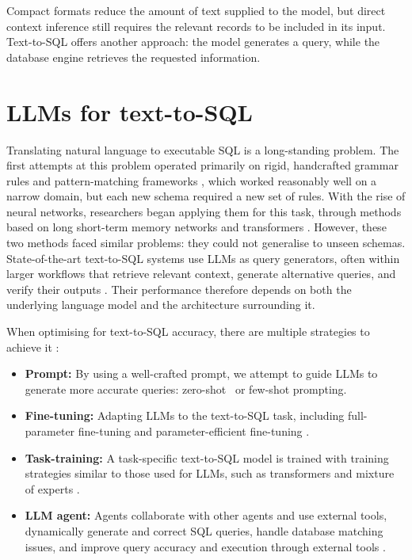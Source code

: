 Compact formats reduce the amount of text supplied to the model, but direct context inference still requires
the relevant records to be included in its input. Text-to-SQL offers another approach: the model generates a
query, while the database engine retrieves the requested information.

\section{LLMs for text-to-SQL}

Translating natural language to executable SQL is a long-standing problem. The first attempts at this problem
operated primarily on rigid, handcrafted grammar rules and pattern-matching frameworks \cite{woods1972lunar,
warren1982efficient}, which worked reasonably well on a narrow domain, but each new schema required a new set
of rules. With the rise of neural networks, researchers began applying them for this task, through methods
based on long short-term memory networks \cite{graves2012long} and transformers \cite{vaswani2017attention}.
However, these two methods faced similar problems: they could not generalise to unseen schemas. State-of-the-art
text-to-SQL systems use LLMs as query generators, often within larger workflows that retrieve relevant
context, generate alternative queries, and verify their outputs \cite{hong2025next}. Their performance
therefore depends on both the underlying language model and the architecture surrounding it.

When optimising for text-to-SQL accuracy, there are multiple strategies to achieve it \cite{zhu2024large}:
\begin{itemize}
  \item \textbf{Prompt:} By using a well-crafted prompt, we attempt to guide LLMs to generate more
    accurate queries: zero-shot~\cite{rajkumar2022evaluating, liu2023comprehensive} or few-shot
    \cite{brown2020language, lee2025mcs} prompting.
  \item \textbf{Fine-tuning:} Adapting LLMs to the text-to-SQL task, including full-parameter fine-tuning
    \cite{hong2024knowledge, zhang2024structure} and parameter-efficient fine-tuning \cite{song2022learning,
    gao2023text}.
  \item \textbf{Task-training:} A task-specific text-to-SQL model is trained with training strategies similar
    to those used for LLMs, such as transformers \cite{li2024codes, fu2023miga} and mixture of experts
    \cite{pourreza2024sql}.
  \item \textbf{LLM agent:} Agents collaborate with other agents and use external tools, dynamically generate
    and correct SQL queries, handle database matching issues, and improve query accuracy and execution
    through external tools \cite{wang2025mac, wang2024tool}.
\end{itemize}

